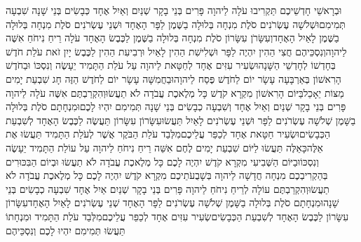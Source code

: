 \documentclass[../main/main.tex]{subfiles}
\begin{document}
\begin{multicols*}{\ncols}
וּבְרָאשֵׁי חָדְשֵׁיכֶם תַּקְרִיבוּ עֹלָה לַיהוָה פָּרִים בְּנֵי בָקָר שְׁנַיִם וְאַיִל אֶחָד כְּבָשִׂים בְּנֵי שָׁנָה שִׁבְעָה תְּמִימִם\PreVerseSpace{}וּשְׁלֹשָׁה עֶשְׂרֹנִים סֹלֶת מִנְחָה בְּלוּלָה בַשֶּׁמֶן לַפָּר הָאֶחָד וּשְׁנֵי עֶשְׂרֹנִים סֹלֶת מִנְחָה בְּלוּלָה בַשֶּׁמֶן לָאַיִל הָאֶחָד\PreVerseSpace{}וְעִשָּׂרֹן עִשָּׂרוֹן סֹלֶת מִנְחָה בְּלוּלָה בַשֶּׁמֶן לַכֶּבֶשׂ הָאֶחָד עֹלָה רֵיחַ נִיחֹחַ אִשֶּׁה לַיהוָה\PreVerseSpace{}וְנִסְכֵּיהֶם חֲצִי הַהִין יִהְיֶה לַפָּר וּשְׁלִישִׁת הַהִין לָאַיִל וּרְבִיעִת הַהִין לַכֶּבֶשׂ יָיִן זֹאת עֹלַת חֹדֶשׁ בְּחָדְשׁוֹ לְחָדְשֵׁי הַשָּׁנָה\PreVerseSpace{}וּשְׂעִיר עִזִּים אֶחָד לְחַטָּאת לַיהוָה עַל עֹלַת הַתָּמִיד יֵעָשֶׂה וְנִסְכּוֹ \ClosedSection{}וּבַחֹדֶשׁ הָרִאשׁוֹן בְּאַרְבָּעָה עָשָׂר יוֹם לַחֹדֶשׁ פֶּסַח לַיהוָה\PreVerseSpace{}וּבַחֲמִשָּׁה עָשָׂר יוֹם לַחֹדֶשׁ הַזֶּה חָג שִׁבְעַת יָמִים מַצּוֹת יֵאָכֵל\PreVerseSpace{}בַּיּוֹם הָרִאשׁוֹן מִקְרָא קֹדֶשׁ כָּל מְלֶאכֶת עֲבֹדָה לֹא תַעֲשׂוּ\PreVerseSpace{}וְהִקְרַבְתֶּם אִשֶּׁה עֹלָה לַיהוָה פָּרִים בְּנֵי בָקָר שְׁנַיִם וְאַיִל אֶחָד וְשִׁבְעָה כְבָשִׂים בְּנֵי שָׁנָה תְּמִימִם יִהְיוּ לָכֶם\PreVerseSpace{}וּמִנְחָתָם סֹלֶת בְּלוּלָה בַשָּׁמֶן שְׁלֹשָׁה עֶשְׂרֹנִים לַפָּר וּשְׁנֵי עֶשְׂרֹנִים לָאַיִל תַּעֲשׂוּ\PreVerseSpace{}עִשָּׂרוֹן עִשָּׂרוֹן תַּעֲשֶׂה לַכֶּבֶשׂ הָאֶחָד לְשִׁבְעַת הַכְּבָשִׂים\PreVerseSpace{}וּשְׂעִיר חַטָּאת אֶחָד לְכַפֵּר עֲלֵיכֶם\PreVerseSpace{}מִלְּבַד עֹלַת הַבֹּקֶר אֲשֶׁר לְעֹלַת הַתָּמִיד תַּעֲשׂוּ אֶת אֵלֶּה\PreVerseSpace{}כָּאֵלֶּה תַּעֲשׂוּ לַיּוֹם שִׁבְעַת יָמִים לֶחֶם אִשֵּׁה רֵיחַ נִיחֹחַ לַיהוָה עַל עוֹלַת הַתָּמִיד יֵעָשֶׂה וְנִסְכּוֹ\PreVerseSpace{}וּבַיּוֹם הַשְּׁבִיעִי מִקְרָא קֹדֶשׁ יִהְיֶה לָכֶם כָּל מְלֶאכֶת עֲבֹדָה לֹא תַעֲשׂוּ \ClosedSection{}וּבְיוֹם הַבִּכּוּרִים בְּהַקְרִיבְכֶם מִנְחָה חֲדָשָׁה לַיהוָה בְּשָׁבֻעֹתֵיכֶם מִקְרָא קֹדֶשׁ יִהְיֶה לָכֶם כָּל מְלֶאכֶת עֲבֹדָה לֹא תַעֲשׂוּ\PreVerseSpace{}וְהִקְרַבְתֶּם עוֹלָה לְרֵיחַ נִיחֹחַ לַיהוָה פָּרִים בְּנֵי בָקָר שְׁנַיִם אַיִל אֶחָד שִׁבְעָה כְבָשִׂים בְּנֵי שָׁנָה\PreVerseSpace{}וּמִנְחָתָם סֹלֶת בְּלוּלָה בַשָּׁמֶן שְׁלֹשָׁה עֶשְׂרֹנִים לַפָּר הָאֶחָד שְׁנֵי עֶשְׂרֹנִים לָאַיִל הָאֶחָד\PreVerseSpace{}עִשָּׂרוֹן עִשָּׂרוֹן לַכֶּבֶשׂ הָאֶחָד לְשִׁבְעַת הַכְּבָשִׂים\PreVerseSpace{}שְׂעִיר עִזִּים אֶחָד לְכַפֵּר עֲלֵיכֶם\PreVerseSpace{}מִלְּבַד עֹלַת הַתָּמִיד וּמִנְחָתוֹ תַּעֲשׂוּ תְּמִימִם יִהְיוּ לָכֶם וְנִסְכֵּיהֶם\OpenSection{}\par

\end{multicols*}
\end{document}
